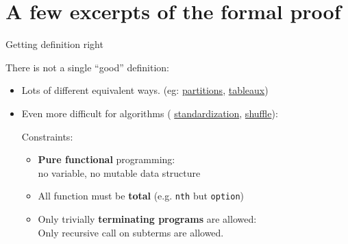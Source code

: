\documentclass[compress,11pt]{beamer}
\begin{document}
\section{A few excerpts of the formal proof}

\begin{frame}[fragile]{Getting definition right}

There is not a single ``good'' definition:
\bigskip

\begin{itemize}
\item Lots of different equivalent ways. (eg:
\href{file:html/Combi.Combi.partition.html#is_part}{partitions},
\href{file:html/Combi.Combi.tableau.html#is_tableau}{tableaux})
\bigskip\pause

\item Even more difficult for algorithms (
\href{file:html/Combi.Combi.std.html#std_rec}{standardization},
\href{file:html/Combi.LRrule.shuffle.html#shuffle_from_rec}{shuffle}):
  \medskip

  Constraints:
  \begin{itemize}
  \item \textbf{Pure functional} programming: \\
    no variable, no mutable data structure
    \bigskip
  \item All function must be \textbf{total} (e.g. \texttt{nth} but \texttt{option}) \\
    \bigskip
  \item Only trivially \textbf{terminating programs} are allowed:\\
    Only recursive call on subterms are allowed.

  \end{itemize}
\end{itemize}
\end{frame}
\end{document}
